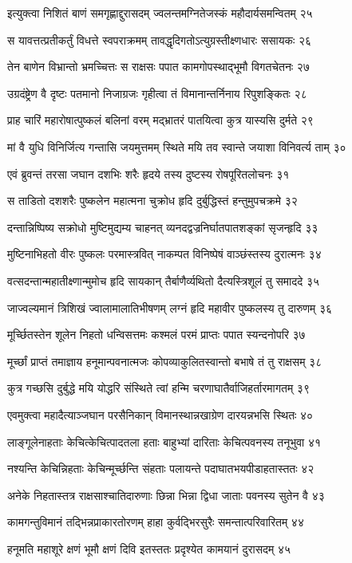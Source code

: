 इत्युक्त्वा निशितं बाणं समगृह्णाद्दुरासदम्
ज्वलन्तमग्नितेजस्कं महौदार्यसमन्वितम् २५

स यावत्तत्प्रतीकर्तुं विधत्ते स्वपराक्रमम्
तावद्धृदिगतोऽत्युग्रस्तीक्ष्णधारः ससायकः २६

तेन बाणेन विभ्रान्तो भ्रमच्चित्तः स राक्षसः
पपात कामगोपस्थाद्भूमौ विगतचेतनः २७

उग्रदंष्ट्रेण वै दृष्टः पतमानो निजाग्रजः
गृहीत्वा तं विमानान्तर्निनाय रिपुशङ्कितः २८

प्राह चारिं महारोषात्पुष्कलं बलिनां वरम्
मद्भ्रातरं पातयित्वा कुत्र यास्यसि दुर्मते २९

मां वै युधि विनिर्जित्य गन्तासि जयमुत्तमम्
स्थिते मयि तव स्वान्ते जयाशा विनिवर्त्य ताम् ३०

एवं ब्रुवन्तं तरसा जघान दशभिः शरैः
हृदये तस्य दुष्टस्य रोषपूरितलोचनः ३१

स ताडितो दशशरैः पुष्कलेन महात्मना
चुक्रोध हृदि दुर्बुद्धिस्तं हन्तुमुपचक्रमे ३२

दन्तान्निष्पिष्य सक्रोधो मुष्टिमुद्यम्य चाहनत्
व्यनदद्वज्रनिर्घातपातशङ्कां सृजन्हृदि ३३

मुष्टिनाभिहतो वीरः पुष्कलः परमास्त्रवित्
नाकम्पत विनिष्पेषं वाञ्छंस्तस्य दुरात्मनः ३४

वत्सदन्तान्महातीक्ष्णान्मुमोच हृदि सायकान्
तैर्बाणैर्व्यथितो दैत्यस्त्रिशूलं तु समाददे ३५

जाज्वल्यमानं त्रिशिखं ज्वालामालातिभीषणम्
लग्नं हृदि महावीर पुष्कलस्य तु दारुणम् ३६

मूर्च्छितस्तेन शूलेन निहतो धन्विसत्तमः
कश्मलं परमं प्राप्तः पपात स्यन्दनोपरि ३७

मूर्च्छां प्राप्तं तमाज्ञाय हनूमान्पवनात्मजः
कोपव्याकुलितस्वान्तो बभाषे तं तु राक्षसम् ३८

कुत्र गच्छसि दुर्बुद्धे मयि योद्धरि संस्थिते
त्वां हन्मि चरणाघातैर्वाजिहर्तारमागतम् ३९

एवमुक्त्वा महादैत्याञ्जघान परसैनिकान्
विमानस्थान्नखाग्रेण दारयन्नभसि स्थितः ४०

लाङ्गूलेनाहताः केचित्केचित्पादतला हताः
बाहुभ्यां दारिताः केचित्पवनस्य तनूभुवा ४१

नश्यन्ति केचिन्निहताः केचिन्मूर्च्छन्ति संहताः
पलायन्ते पदाघातभयपीडाहतास्ततः ४२

अनेके निहतास्तत्र राक्षसाश्चातिदारुणाः
छिन्ना भिन्ना द्विधा जाताः पवनस्य सुतेन वै ४३

कामगन्तुविमानं तद्भिन्नप्राकारतोरणम्
हाहा कुर्वद्भिरसुरैः समन्तात्परिवारितम् ४४

हनूमति महाशूरे क्षणं भूमौ क्षणं दिवि
इतस्ततः प्रदृश्येत कामयानं दुरासदम् ४५

